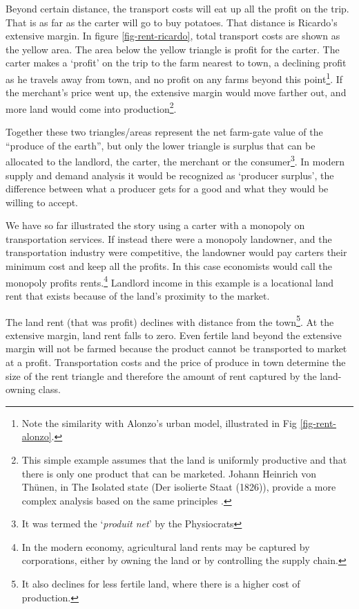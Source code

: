 Beyond certain distance, the transport costs will eat up all the profit on the trip. That is as far as the carter will go to buy potatoes. That distance is Ricardo's extensive margin. In figure \ref{fig-rent-ricardo}, total transport costs are shown as the yellow area. The area below the yellow triangle is profit for the carter. The carter makes a `profit' on the trip to the farm nearest to town, a declining profit as he travels away from town, and no profit on any farms beyond this point\footnote{Note the similarity with Alonzo's urban model, illustrated in Fig \ref{fig-rent-alonzo}.}.
If the merchant's price went up, the extensive margin would move farther out, and more land would come into production\footnote{This simple example assumes that the land is uniformly productive and that there is only one product that can be marketed. Johann Heinrich von Th\"unen, in The Isolated state (Der isolierte Staat (1826)), provide a more complex analysis based on the same principles \cite{GET_Johann_Heinrich}.}.

Together these two triangles/areas represent the net farm-gate value of the ``produce of the earth'', but only the lower triangle is surplus that can be allocated to the landlord, the carter, the merchant or the consumer\footnote{It was termed the `\textit{produit net}' by the Physiocrats}. In modern supply and demand analysis it would be recognized as `producer surplus', the difference between what a producer gets for a good and what they would be willing to accept.

We have so far illustrated the story using a carter with a monopoly on transportation services. If instead there were a monopoly landowner, and the transportation industry were competitive, the landowner would pay carters their minimum cost and keep all the profits. In this case economists would call the monopoly profits rents.\footnote{In the modern economy, agricultural land rents may be captured by corporations,  either by owning the land or by controlling the supply chain.}  Landlord income in this example is a locational land rent that exists because of the land's proximity to the market.  

The land rent (that was profit) declines with distance from the town\footnote{It also declines for less fertile land, where there is a higher cost of production.}. At the extensive margin, land rent falls to zero. Even fertile land beyond the extensive margin will not be farmed because the product cannot be transported to market at a profit. Transportation costs and the price of produce in town determine the size of the  rent triangle and therefore the amount of rent captured by the land-owning class.%


